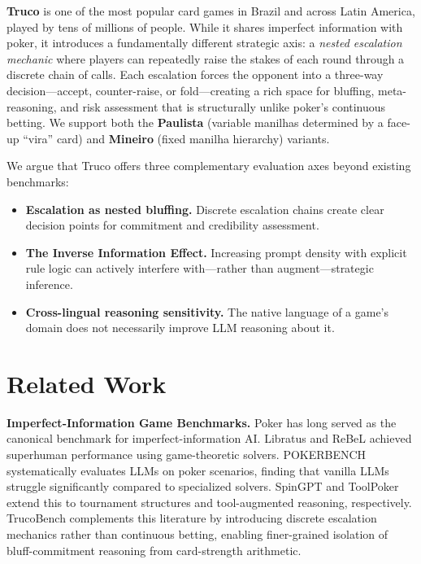 \documentclass[11pt]{article}
\begin{document}
\textbf{Truco} is one of the most popular card games in Brazil and across Latin America, played by tens of millions of people. While it shares imperfect information with poker, it introduces a fundamentally different strategic axis: a \emph{nested escalation mechanic} where players can repeatedly raise the stakes of each round through a discrete chain of calls. Each escalation forces the opponent into a three-way decision---accept, counter-raise, or fold---creating a rich space for bluffing, meta-reasoning, and risk assessment that is structurally unlike poker's continuous betting. We support both the \textbf{Paulista} (variable manilhas determined by a face-up ``vira'' card) and \textbf{Mineiro} (fixed manilha hierarchy) variants.

We argue that Truco offers three complementary evaluation axes beyond existing benchmarks:
\begin{itemize}
    \item \textbf{Escalation as nested bluffing.} Discrete escalation chains create clear decision points for commitment and credibility assessment.
    \item \textbf{The Inverse Information Effect.} Increasing prompt density with explicit rule logic can actively interfere with---rather than augment---strategic inference.
    \item \textbf{Cross-lingual reasoning sensitivity.} The native language of a game's domain does not necessarily improve LLM reasoning about it.
\end{itemize}

\section{Related Work}

\textbf{Imperfect-Information Game Benchmarks.}
Poker has long served as the canonical benchmark for imperfect-information AI. Libratus \cite{brown2018libratus} and ReBeL \cite{brown2020rebel} achieved superhuman performance using game-theoretic solvers. POKERBENCH \cite{zhuang2025pokerbench} systematically evaluates LLMs on poker scenarios, finding that vanilla LLMs struggle significantly compared to specialized solvers. SpinGPT \cite{maugin2025spingpt} and ToolPoker \cite{toolpoker2026} extend this to tournament structures and tool-augmented reasoning, respectively. TrucoBench complements this literature by introducing discrete escalation mechanics rather than continuous betting, enabling finer-grained isolation of bluff-commitment reasoning from card-strength arithmetic.
\end{document}
